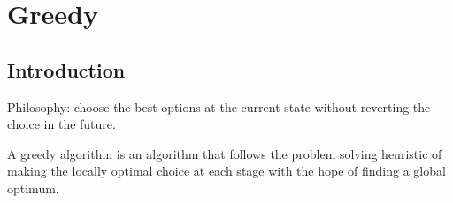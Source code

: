 \chapter{Greedy}

\section{Introduction}
Philosophy: choose the best options at the current state without reverting the choice in the future. 

A greedy algorithm is an algorithm that follows the problem solving heuristic of making the locally optimal choice at each stage with the hope of finding a global optimum.

